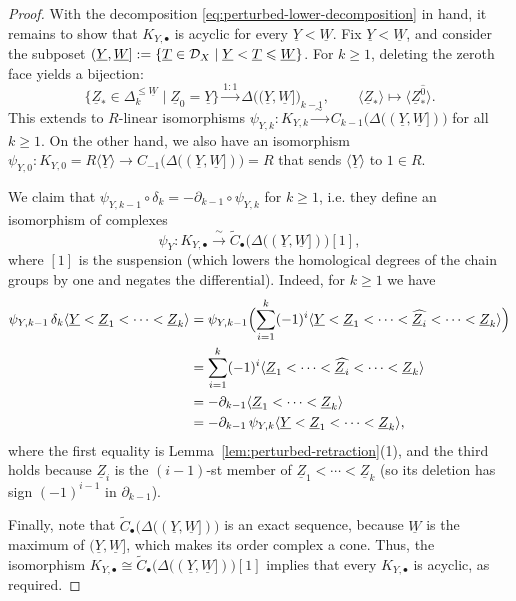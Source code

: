 \documentclass[a4paper,leqno]{amsart}
\begin{document}
\begin{proof}
With the decomposition \eqref{eq:perturbed-lower-decomposition} in hand, it remains to show that $K_{Y,\bullet}$ is acyclic for every $\underline{Y}<\underline{W}$.  Fix $\underline{Y}<\underline{W}$, and consider the subposet $(\underline{Y},\underline{W}]:=\{\underline{T}\in\mathcal D_X\mid\underline{Y}<\underline{T}\leqslant\underline{W}\}$.
For $k\ge 1$, deleting the zeroth face yields a bijection:
\[
\{ \underline{Z}_\ast \in \Delta_k^{\le \underline{W}} \mid \underline{Z}_0=\underline{Y} \} \xrightarrow{1:1} \Delta\bigl((\underline{Y},\underline{W}]\bigr)_{k-1}, \qquad \langle \underline{Z}_\ast\rangle \longmapsto \langle \underline{Z}_\ast^{\widehat{0}} \rangle.
\]
This extends to $R$-linear isomorphisms $\psi_{Y,k}\colon K_{Y,k}\xrightarrow{\ \sim\ \ }C_{k-1}\bigl(\Delta((\underline{Y},\underline{W}])\bigr)$ for all $k\ge 1$.
On the other hand, we also have an isomorphism $\psi_{Y,0}:K_{Y,0} = R\langle \underline{Y}\rangle \to C_{-1}\bigl(\Delta((\underline{Y},\underline{W}])\bigr)=R$ that
sends $\langle\underline{Y}\rangle$ to $1\in R$.

We claim that $\psi_{Y,k-1}\circ\delta_k=-\partial_{k-1}\circ\psi_{Y,k}$ for $k\geq1$, i.e. they define an isomorphism of complexes
\[
 \psi_Y\colon K_{Y,\bullet}\xrightarrow{\ \sim\ }\widetilde C_\bullet\bigl(\Delta((\underline{Y},\underline{W}])\bigr)[1],
\]
where $[1]$ is the suspension (which lowers the homological degrees of the chain groups by one and negates the differential).
Indeed, for $k\geq1$ we have
\begin{align*}
 \psi_{Y,k-1}\,\delta_k\langle\underline{Y}<\underline{Z}_1<\cdots<\underline{Z}_k\rangle
 &=\psi_{Y,k-1}\Bigl(\sum_{i=1}^k(-1)^i\langle\underline{Y}<\underline{Z}_1<\cdots<\widehat{\underline{Z}_i}<\cdots<\underline{Z}_k\rangle\Bigr)\\
 &=\sum_{i=1}^k(-1)^i\langle\underline{Z}_1<\cdots<\widehat{\underline{Z}_i}<\cdots<\underline{Z}_k\rangle\\
 &=-\partial_{k-1}\langle\underline{Z}_1<\cdots<\underline{Z}_k\rangle\\
 &=-\partial_{k-1}\,\psi_{Y,k}\langle\underline{Y}<\underline{Z}_1<\cdots<\underline{Z}_k\rangle,
\end{align*}
where the first equality is Lemma~\ref{lem:perturbed-retraction}\textup{(1)}, and the third holds because $\underline{Z}_i$ is the $(i-1)$-st member of $\underline{Z}_1<\cdots<\underline{Z}_k$ (so its deletion has sign $(-1)^{i-1}$ in $\partial_{k-1}$).

Finally, note that $\widetilde{C}_\bullet\bigl(\Delta((\underline{Y},\underline{W}])\bigr)$ is an exact sequence, because $\underline{W}$ is the maximum of $(\underline{Y},\underline{W}]$, which makes its order complex a cone.  Thus, the isomorphism $K_{Y,\bullet}\cong \widetilde{C}_\bullet\bigl(\Delta((\underline{Y},\underline{W}])\bigr)[1]$ implies that every $K_{Y,\bullet}$ is acyclic, as required.
\end{proof}
\end{document}
